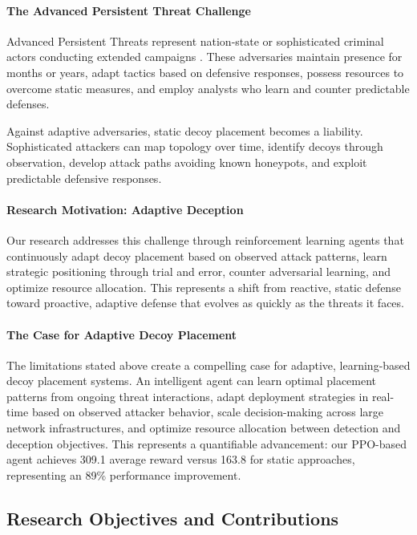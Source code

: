 \documentclass[12pt,oneside]{article}
\begin{document}
\paragraph{The Advanced Persistent Threat Challenge} Advanced Persistent Threats represent nation-state or sophisticated criminal actors conducting extended campaigns \cite{hutchins2011intelligence}. These adversaries maintain presence for months or years, adapt tactics based on defensive responses, possess resources to overcome static measures, and employ analysts who learn and counter predictable defenses.

Against adaptive adversaries, static decoy placement becomes a liability. Sophisticated attackers can map topology over time, identify decoys through observation, develop attack paths avoiding known honeypots, and exploit predictable defensive responses.

\paragraph{Research Motivation: Adaptive Deception} Our research addresses this challenge through reinforcement learning agents that continuously adapt decoy placement based on observed attack patterns, learn strategic positioning through trial and error, counter adversarial learning, and optimize resource allocation. This represents a shift from reactive, static defense toward proactive, adaptive defense that evolves as quickly as the threats it faces.

\paragraph{The Case for Adaptive Decoy Placement}

The limitations stated above create a compelling case for adaptive, learning-based decoy placement systems. An intelligent agent can learn optimal placement patterns from ongoing threat interactions, adapt deployment strategies in real-time based on observed attacker behavior, scale decision-making across large network infrastructures, and optimize resource allocation between detection and deception objectives. This represents a quantifiable advancement: our PPO-based agent achieves 309.1 average reward versus 163.8 for static approaches, representing an 89\% performance improvement.



\subsection{Research Objectives and Contributions}
\end{document}
